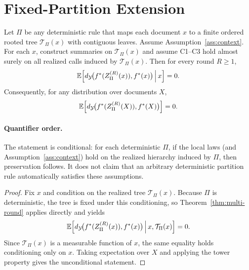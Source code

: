 \section{Fixed-Partition Extension}\label{app:fixed-partition}

\begin{theorem}\label{thm:fixed-partition}
Let $\Pi$ be any deterministic rule that maps each document $x$ to a finite ordered rooted tree $\mathcal{T}_\Pi(x)$ with contiguous leaves. Assume Assumption~\ref{ass:context}. For each $x$, construct summaries on $\mathcal{T}_\Pi(x)$ and assume C1--C3 hold almost surely on all realized calls induced by $\mathcal{T}_\Pi(x)$. Then for every round $R \ge 1$,
\[
\mathbb{E}\!\left[d_{\mathcal{Y}}\!\big(f^\ast(Z_\Pi^{(R)}(x)),f^\ast(x)\big)\,\middle|\,x\right]=0.
\]
Consequently, for any distribution over documents $X$,
\[
\mathbb{E}\!\left[d_{\mathcal{Y}}\!\big(f^\ast(Z_\Pi^{(R)}(X)),f^\ast(X)\big)\right]=0.
\]
\end{theorem}

\paragraph{Quantifier order.}
The statement is conditional: for each deterministic $\Pi$, if the local laws (and Assumption~\ref{ass:context}) hold on the realized hierarchy induced by $\Pi$, then preservation follows. It does not claim that an arbitrary deterministic partition rule automatically satisfies these assumptions.

\begin{proof}
Fix $x$ and condition on the realized tree $\mathcal{T}_\Pi(x)$. Because $\Pi$ is deterministic, the tree is fixed under this conditioning, so Theorem~\ref{thm:multi-round} applies directly and yields
\[
\mathbb{E}\!\left[d_{\mathcal{Y}}\!\big(f^\ast(Z_\Pi^{(R)}(x)),f^\ast(x)\big)\,\middle|\,x,\mathcal{T}_\Pi(x)\right]=0.
\]
Since $\mathcal{T}_\Pi(x)$ is a measurable function of $x$, the same equality holds conditioning only on $x$. Taking expectation over $X$ and applying the tower property gives the unconditional statement.
\end{proof}
